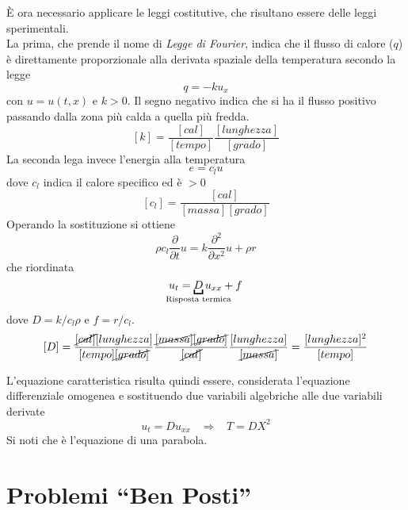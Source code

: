 \`E ora necessario applicare le leggi costitutive, che risultano essere delle leggi sperimentali.\\
La prima, che prende il nome di \textit{Legge di Fourier}, indica che il flusso di calore ($q$) \`e direttamente proporzionale
alla derivata spaziale della temperatura secondo la legge
\[
	q= -ku_x
\]
con $u=u(t,x)$ e $k>0$. Il segno negativo indica che si ha il flusso positivo passando dalla zona pi\`u calda a quella pi\`u fredda.
\[
	[k]= \frac{[cal]}{[tempo]}\frac{[lunghezza]}{[grado]}
\]
La seconda lega invece l'energia alla temperatura
\[
	e= c_lu
\]
dove $c_l$ indica il calore specifico ed \`e $>0$
\[
	[c_l]=\frac{[cal]}{[massa][grado]}
\]
Operando la sostituzione si ottiene
\[
	\rho c_l \frac{\partial}{\partial t} u= k \frac{\partial^2}{\partial x^2}u + \rho r
\]
che riordinata
\[
	u_t= \underbracket{D}_{\mathclap{\text{Risposta termica}}} u_{xx}+f
\]
dove $D=k/c_l\rho$ e $f=r/c_l$.
\[
	[D]=\frac{\cancel{[cal]}[lunghezza]}{[tempo]\cancel{[grado]}}\frac{\cancel{[massa]}\cancel{[grado]}}{\cancel{[cal]}}
	\frac{[lunghezza]}{\cancel{[massa]}}=\frac{[lunghezza]^2}{[tempo]}
\]

L'equazione caratteristica risulta quindi essere, considerata l'equazione differenziale omogenea e sostituendo due variabili algebriche alle due variabili derivate
\[
	u_t= Du_{xx} \;\;\; \Rightarrow \;\;\; T=DX^2
\]
Si noti che \`e l'equazione di una parabola.
\section{Problemi ``Ben Posti''}